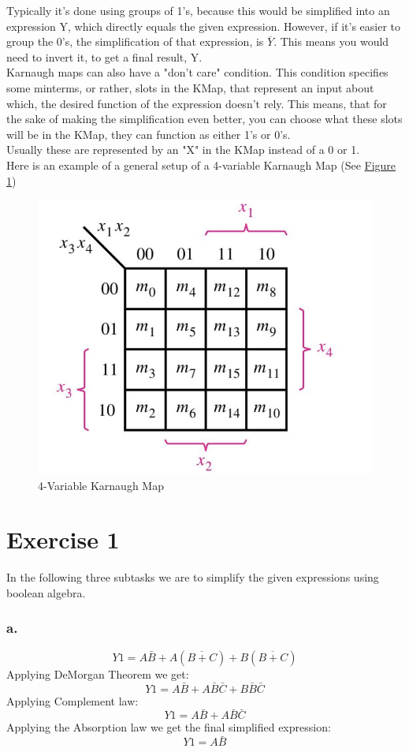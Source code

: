\documentclass{article}
\begin{document}
\noindent Typically it's done using groups of 1's, because this would be simplified into an expression Y, which directly equals the given expression.
However, if it's easier to group the 0's, the simplification of that expression, is $\overline{Y}$. This means you would need to
invert it, to get a final result, Y.\\[0.05cm]

\noindent Karnaugh maps can also have a "don't care" condition. This condition specifies some minterms, or rather, slots in the KMap, that represent
an input about which, the desired function of the expression doesn't rely. This means, that for the sake of making the simplification even better,
you can choose what these slots will be in the KMap, they can function as either 1's or 0's.\\
Usually these are represented by an "X" in the KMap instead of a 0 or 1.\\[0.05cm]

\noindent Here is an example of a general setup of a 4-variable Karnaugh Map (See \hyperlink{kmapsample}{Figure 1})
\begin{figure}[h]
    \centering
    \caption{4-Variable Karnaugh Map}\label{fig:kmapsample}\hypertarget{kmapsample}{\space}
    \includegraphics[width=0.42\linewidth, keepaspectratio=true]{kmapSample}
\end{figure}

\pagebreak

 \addtocounter{section}{1}
\section*{Exercise 1}
\noindent In the following three subtasks we are to simplify the given expressions using boolean algebra.
\subsubsection*{a.} 
\[Y1= A\bar{B} + A(\overline{B+C}) + B(\overline{B+C})\]
Applying DeMorgan Theorem we get:
\[Y1 = A\bar{B} + A\bar{B}\bar{C} + B\bar{B}\bar{C}\]
Applying Complement law: 
\[Y1 = A\bar{B} + A\bar{B}\bar{C}\]
Applying the Absorption law we get the final simplified expression:
\[Y1 = A\bar{B}\]
\end{document}
